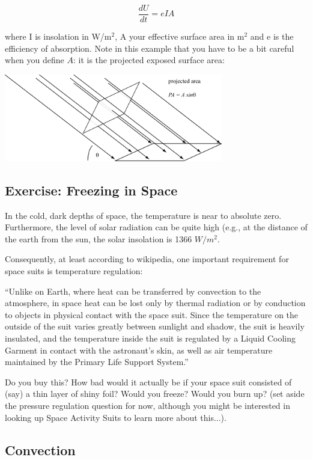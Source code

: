 $$\frac{dU}{dt} = e I A$$

where  I is insolation in W/m$^2$, A your effective surface area in m$^2$ and e is the efficiency of absorption.  Note in this example that you have to be a bit careful when you define $A$:  it is the projected exposed surface area:

\beforefig
 \centerline{\includegraphics[height=1.5in]{figs/ProjectedArea}}
\afterfig

\subsection{Exercise: Freezing in Space}

In the cold, dark depths of space, the temperature is near to absolute zero.  Furthermore, the level of solar radiation can be quite high (e.g., at the distance of the earth from the sun, the solar insolation is 1366 $W/m^2$.  

Consequently,  at least according to wikipedia, one important requirement for space suits is  temperature regulation:

``Unlike on Earth, where heat can be transferred by convection to the atmosphere, in space heat can be lost only by thermal radiation or by conduction to objects in physical contact with the space suit. Since the temperature on the outside of the suit varies greatly between sunlight and shadow, the suit is heavily insulated, and the temperature inside the suit is regulated by a Liquid Cooling Garment in contact with the astronaut's skin, as well as air temperature maintained by the Primary Life Support System.''

Do you buy this?  How bad would it actually be if your space suit consisted of (say) a thin layer of shiny foil?  Would you freeze?  Would you burn up?  (set aside the pressure regulation question for now, although you might be interested in looking up Space Activity Suits to learn more about this...). 

\subsection{Convection}

